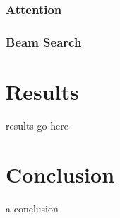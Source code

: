 \documentclass[apj]{emulateapj}
\begin{document}
\subsubsection{Attention} 
\subsubsection{Beam Search} 


\section{Results}
results go here

\section{Conclusion} 
a conclusion

 

\begin{thebibliography}{99}

\end{thebibliography}
\end{document}
